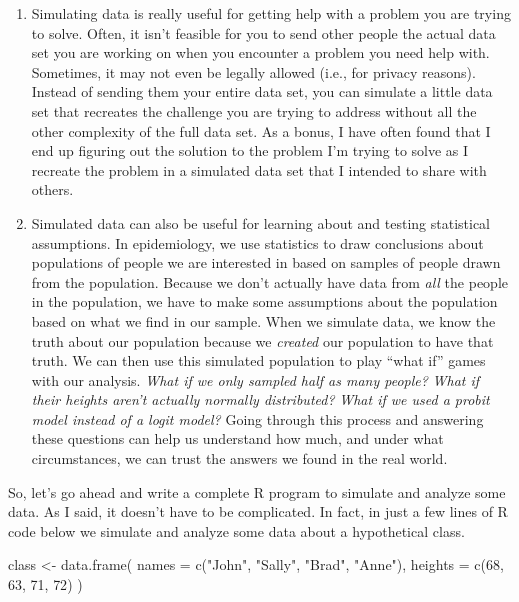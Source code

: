 \documentclass[
  letterpaper,
  DIV=11,
  numbers=noendperiod]{scrreprt}
\newenvironment{Shaded}{\begin{snugshade}}{\end{snugshade}}
\newcommand{\AttributeTok}[1]{\textcolor[rgb]{0.40,0.45,0.13}{#1}}
\newcommand{\DecValTok}[1]{\textcolor[rgb]{0.68,0.00,0.00}{#1}}
\newcommand{\FunctionTok}[1]{\textcolor[rgb]{0.28,0.35,0.67}{#1}}
\newcommand{\NormalTok}[1]{\textcolor[rgb]{0.00,0.23,0.31}{#1}}
\newcommand{\OtherTok}[1]{\textcolor[rgb]{0.00,0.23,0.31}{#1}}
\newcommand{\StringTok}[1]{\textcolor[rgb]{0.13,0.47,0.30}{#1}}
\begin{document}
\begin{enumerate}
\def\labelenumi{\arabic{enumi}.}
\item
  Simulating data is really useful for getting help with a problem you
  are trying to solve. Often, it isn't feasible for you to send other
  people the actual data set you are working on when you encounter a
  problem you need help with. Sometimes, it may not even be legally
  allowed (i.e., for privacy reasons). Instead of sending them your
  entire data set, you can simulate a little data set that recreates the
  challenge you are trying to address without all the other complexity
  of the full data set. As a bonus, I have often found that I end up
  figuring out the solution to the problem I'm trying to solve as I
  recreate the problem in a simulated data set that I intended to share
  with others.
\item
  Simulated data can also be useful for learning about and testing
  statistical assumptions. In epidemiology, we use statistics to draw
  conclusions about populations of people we are interested in based on
  samples of people drawn from the population. Because we don't actually
  have data from \emph{all} the people in the population, we have to
  make some assumptions about the population based on what we find in
  our sample. When we simulate data, we know the truth about our
  population because we \emph{created} our population to have that
  truth. We can then use this simulated population to play ``what if''
  games with our analysis. \emph{What if we only sampled half as many
  people?} \emph{What if their heights aren't actually normally
  distributed?} \emph{What if we used a probit model instead of a logit
  model?} Going through this process and answering these questions can
  help us understand how much, and under what circumstances, we can
  trust the answers we found in the real world.
\end{enumerate}

So, let's go ahead and write a complete R program to simulate and
analyze some data. As I said, it doesn't have to be complicated. In
fact, in just a few lines of R code below we simulate and analyze some
data about a hypothetical class.

\begin{Shaded}
\begin{Highlighting}[]
\NormalTok{class }\OtherTok{\textless{}{-}} \FunctionTok{data.frame}\NormalTok{(}
  \AttributeTok{names   =} \FunctionTok{c}\NormalTok{(}\StringTok{"John"}\NormalTok{, }\StringTok{"Sally"}\NormalTok{, }\StringTok{"Brad"}\NormalTok{, }\StringTok{"Anne"}\NormalTok{),}
  \AttributeTok{heights =} \FunctionTok{c}\NormalTok{(}\DecValTok{68}\NormalTok{, }\DecValTok{63}\NormalTok{, }\DecValTok{71}\NormalTok{, }\DecValTok{72}\NormalTok{)}
\NormalTok{)}
\end{Highlighting}
\end{Shaded}
\end{document}
